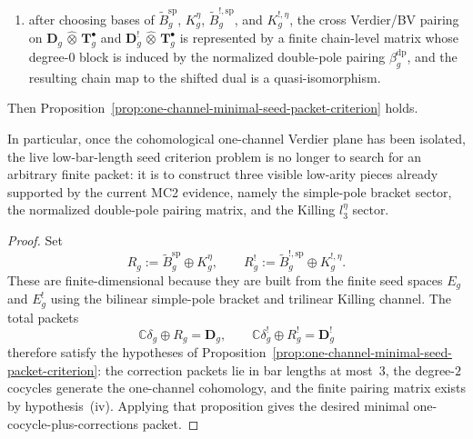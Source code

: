 \begin{proposition}
\begin{enumerate}[label=\textup{(\roman*)}]
\[  \hookrightarrow C_g^-,
  \]
  identifying
  $[\delta_g]\otimes[\tau_g]$ and
  $[\delta_g^!]\otimes[\tau_g]$ with the lines
  $L_g \subset Q_g(\cA)$ and
  $L_g^! \subset Q_g(\cA^!)$;
\item after choosing bases of
  $\widetilde{B}_g^{\mathrm{sp}}$, $K_g^\eta$,
  $\widetilde{B}_g^{!,\mathrm{sp}}$, and $K_g^{!,\eta}$,
  the cross Verdier/BV pairing on
  $\mathbf{D}_g \,\widehat{\otimes}\, \mathbf{T}_g^\bullet$ and
  $\mathbf{D}_g^! \,\widehat{\otimes}\, \mathbf{T}_g^\bullet$
  is represented by a finite chain-level matrix whose degree-$0$
  block is induced by the normalized double-pole pairing
  $\beta_g^{\mathrm{dp}}$, and the resulting chain map to the shifted
  dual is a quasi-isomorphism.
\end{enumerate}
Then Proposition~\ref{prop:one-channel-minimal-seed-packet-criterion}
holds.

In particular, once the cohomological one-channel Verdier plane has
been isolated, the live low-bar-length seed criterion problem is no
longer to search for an arbitrary finite packet: it is to construct
three visible low-arity pieces already supported by the current MC2
evidence, namely the simple-pole bracket sector, the normalized
double-pole pairing matrix, and the Killing $l_3^\eta$ sector.
\end{proposition}

\begin{proof}
Set
\[
R_g := \widetilde{B}_g^{\mathrm{sp}} \oplus K_g^\eta,
\qquad
R_g^! := \widetilde{B}_g^{!,\mathrm{sp}} \oplus K_g^{!,\eta}.
\]
These are finite-dimensional because they are built from the finite
seed spaces $E_g$ and $E_g^!$ using the bilinear simple-pole bracket
and trilinear Killing channel.  The total packets
\[
\mathbb{C}\delta_g \oplus R_g = \mathbf{D}_g,
\qquad
\mathbb{C}\delta_g^! \oplus R_g^! = \mathbf{D}_g^!
\]
therefore satisfy the hypotheses of
Proposition~\ref{prop:one-channel-minimal-seed-packet-criterion}: the
correction packets lie in bar lengths at most~$3$, the degree-$2$
cocycles generate the one-channel cohomology, and the finite pairing
matrix exists by hypothesis~\textup{(iv)}.  Applying that proposition
gives the desired minimal one-cocycle-plus-corrections packet.
\end{proof}

